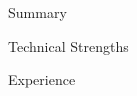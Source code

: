 \documentclass{resume}
\begin{document}
\begin{section}{Summary}
\end{section}

\begin{section}{Technical Strengths}
\end{section}

\begin{section}{Experience}
\end{section}


\end{document}
